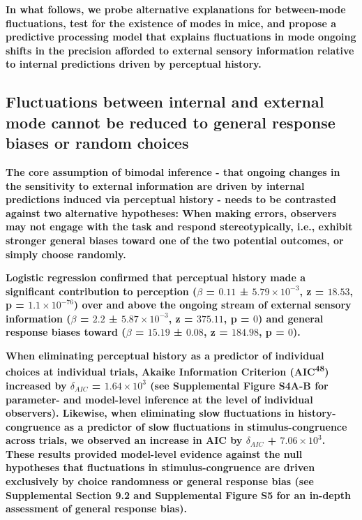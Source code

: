\documentclass[
]{article}
\begin{document}
\textbf{In what follows, we probe alternative explanations for
between-mode fluctuations, test for the existence of modes in mice, and
propose a predictive processing model that explains fluctuations in mode
ongoing shifts in the precision afforded to external sensory information
relative to internal predictions driven by perceptual history.}

\hypertarget{fluctuations-between-internal-and-external-mode-cannot-be-reduced-to-general-response-biases-or-random-choices}{%
\subsection{Fluctuations between internal and external mode cannot be
reduced to general response biases or random
choices}\label{fluctuations-between-internal-and-external-mode-cannot-be-reduced-to-general-response-biases-or-random-choices}}

\textbf{The core assumption of bimodal inference - that ongoing changes
in the sensitivity to external information are driven by internal
predictions induced via perceptual history - needs to be contrasted
against two alternative hypotheses: When making errors, observers may
not engage with the task and respond stereotypically, i.e., exhibit
stronger general biases toward one of the two potential outcomes, or
simply choose randomly.}

\textbf{Logistic regression confirmed that perceptual history made a
significant contribution to perception (\(\beta\) = \(0.11\) ±
\(\ensuremath{5.79\times 10^{-3}}\), z = \(18.53\), p =
\(\ensuremath{1.1\times 10^{-76}}\)) over and above the ongoing stream
of external sensory information (\(\beta\) = \(2.2\) ±
\(\ensuremath{5.87\times 10^{-3}}\), z = \(375.11\), p = \(0\)) and
general response biases toward (\(\beta\) = \(15.19\) ± \(0.08\), z =
\(184.98\), p = \(0\)).}

\textbf{When eliminating perceptual history as a predictor of individual
choices at individual trials, Akaike Information Criterion
(AIC\textsuperscript{48}) increased by \(\delta_{AIC}\) =
\(\ensuremath{1.64\times 10^{3}}\) (see Supplemental Figure S4A-B for
parameter- and model-level inference at the level of individual
observers). Likewise, when eliminating slow fluctuations in
history-congruence as a predictor of slow fluctuations in
stimulus-congruence across trials, we observed an increase in AIC by
\(\delta_{AIC}\) + \(\ensuremath{7.06\times 10^{3}}\). These results
provided model-level evidence against the null hypotheses that
fluctuations in stimulus-congruence are driven exclusively by choice
randomness or general response bias (see Supplemental Section 9.2 and
Supplemental Figure S5 for an in-depth assessment of general response
bias).}
\end{document}
